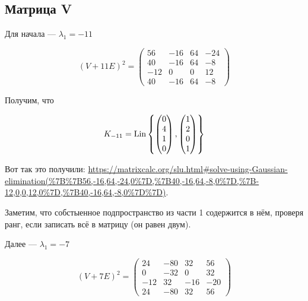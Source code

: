 \documentclass[12pt, a4paper]{article}
\begin{document}
    
    \subsection{Матрица V}

    Для начала — $\lambda_1 = -11$

    \begin{equation}
        (V + 11E)^2 = \left(\begin{matrix}
            56 & -16 & 64 & -24 \\
            40 & -16 & 64 & -8 \\
            -12 & 0 & 0 & 12 \\
            40 & -16 & 64 & -8
        \end{matrix}\right)
    \end{equation}

    Получим, что 

    \begin{equation}
        K_{-11} = \operatorname{Lin} \left\{ \begin{pmatrix} 0\\4\\1\\0 \end{pmatrix}, \begin{pmatrix} 1\\2\\0\\1 \end{pmatrix} \right\}
    \end{equation}

    Вот так это получили: \url{https://matrixcalc.org/slu.html#solve-using-Gaussian-elimination(%7B%7B56,-16,64,-24,0%7D,%7B40,-16,64,-8,0%7D,%7B-12,0,0,12,0%7D,%7B40,-16,64,-8,0%7D%7D)}.

    Заметим, что собстыенное подпространство из части 1 содержится в нём, проверя ранг, если записать всё в матрицу (он равен двум).

    Далее — $\lambda_1 = -7$

    \begin{equation}
        (V + 7E)^2 = \left(\begin{matrix}
            24 & -80 & 32 & 56 \\
            0 & -32 & 0 & 32 \\
            -12 & 32 & -16 & -20 \\
            24 & -80 & 32 & 56
        \end{matrix}\right)
    \end{equation}
\end{document}

